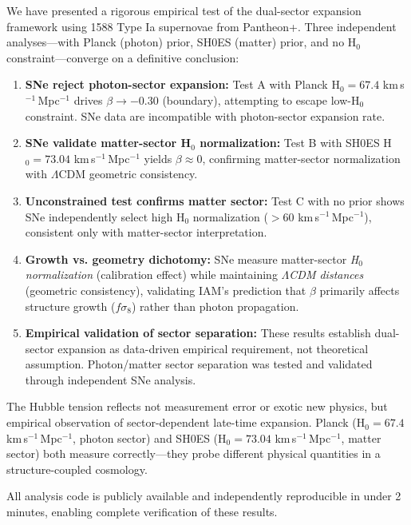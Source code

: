 \documentclass[twocolumn,superscriptaddress,prd,amsmath,amssymb]{revtex4-2}
\begin{document}
We have presented a rigorous empirical test of the dual-sector expansion framework using 1588 Type Ia supernovae from Pantheon+. Three independent analyses—with Planck (photon) prior, SH0ES (matter) prior, and no H$_0$ constraint—converge on a definitive conclusion:

\begin{enumerate}
\item \textbf{SNe reject photon-sector expansion:} Test A with Planck H$_0 = 67.4$ km\,s$^{-1}$\,Mpc$^{-1}$ drives $\beta \to -0.30$ (boundary), attempting to escape low-H$_0$ constraint. SNe data are incompatible with photon-sector expansion rate.

\item \textbf{SNe validate matter-sector H$_0$ normalization:} Test B with SH0ES H$_0 = 73.04$ km\,s$^{-1}$\,Mpc$^{-1}$ yields $\beta \approx 0$, confirming matter-sector normalization with $\Lambda$CDM geometric consistency.

\item \textbf{Unconstrained test confirms matter sector:} Test C with no prior shows SNe independently select high H$_0$ normalization ($>60$ km\,s$^{-1}$\,Mpc$^{-1}$), consistent only with matter-sector interpretation.

\item \textbf{Growth vs. geometry dichotomy:} SNe measure matter-sector \textit{H$_0$ normalization} (calibration effect) while maintaining \textit{$\Lambda$CDM distances} (geometric consistency), validating IAM's prediction that $\beta$ primarily affects structure growth ($f\sigma_8$) rather than photon propagation.

\item \textbf{Empirical validation of sector separation:} These results establish dual-sector expansion as data-driven empirical requirement, not theoretical assumption. Photon/matter sector separation was tested and validated through independent SNe analysis.
\end{enumerate}

The Hubble tension reflects not measurement error or exotic new physics, but empirical observation of sector-dependent late-time expansion. Planck (H$_0 = 67.4$ km\,s$^{-1}$\,Mpc$^{-1}$, photon sector) and SH0ES (H$_0 = 73.04$ km\,s$^{-1}$\,Mpc$^{-1}$, matter sector) both measure correctly—they probe different physical quantities in a structure-coupled cosmology.

All analysis code is publicly available and independently reproducible in under 2 minutes, enabling complete verification of these results.
\end{document}
